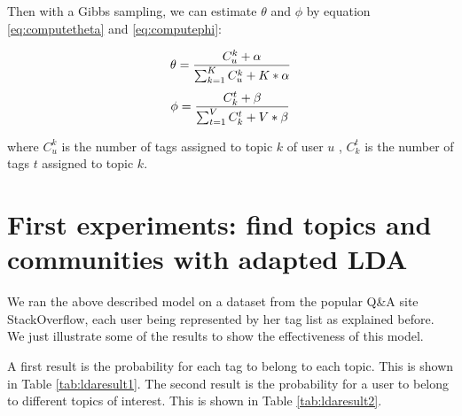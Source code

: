 Then with a Gibbs sampling, we can estimate $\theta$ and $\phi$ by equation \ref{eq:computetheta} and \ref{eq:computephi}:

\begin{equation}\scriptsize
\theta=\frac{ C_u^k + \alpha}{ \sum_{k=1}^K C_u^k+ K* \alpha}
\label{eq:computetheta} 
\end{equation}
\begin{equation}\scriptsize
\phi =\frac{ C_k^t + \beta}{ \sum_{t=1}^V C_k^t+ V* \beta}
\label{eq:computephi} 
\end{equation}

\noindent
where $C_u^k$ is the number of tags assigned to topic $k$ of user $u$ , $C_k^t$ is the number of tags $t$ assigned to topic $k$.


\section{First experiments: find topics and communities with adapted LDA}

We ran the above described model on a dataset from the popular Q\&A site StackOverflow, each user being represented by her tag list as explained before. We just illustrate some of the results to show the effectiveness of this model.

A first result is the probability for each tag to belong to each topic. This is  shown in Table \ref{tab:ldaresult1}. 
The second result is the probability for a user to belong to different topics of interest. This is shown in Table \ref{tab:ldaresult2}. 

